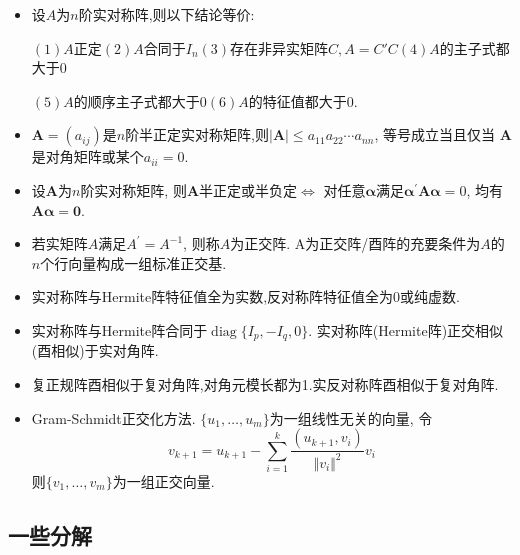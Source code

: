 \documentclass[UTF8]{ctexart}
\begin{document}
\begin{itemize}
	\item 设$A$为$n$阶实对称阵,则以下结论等价:\par
	      $(1)$$A$正定\quad $(2)$$A$合同于$I_n$\quad $(3)$存在非异实矩阵$C,A=C'C$\quad $(4)$$A$的主子式都大于$0$\par
		      $(5)$$A$的顺序主子式都大于$0$\quad $(6)$$A$的特征值都大于$0$.

	\item $\boldsymbol{A}=\left(a_{i j}\right)$是$n$阶半正定实对称矩阵,则$|\boldsymbol{A}| \leq a_{11} a_{22} \cdots a_{n n}$,
	      等号成立当且仅当 $\boldsymbol{A}$ 是对角矩阵或某个$a_{ii}=0$.

	\item 设$\boldsymbol{A}$为$n$阶实对称矩阵, 则$\boldsymbol{A}$半正定或半负定$\Leftrightarrow$
	      对任意$\boldsymbol{\alpha}$满足$\boldsymbol{\alpha}^{\prime} \boldsymbol{A} \boldsymbol{\alpha}=0$,
	      均有$\boldsymbol{A} \boldsymbol{\alpha}=\mathbf{0}$.

	\item 若实矩阵$A$满足$A^{\prime}=A^{-1}$, 则称$A$为正交阵.
	      A为正交阵/酉阵的充要条件为$A$的$n$个行向量构成一组标准正交基.

	\item 实对称阵与Hermite阵特征值全为实数,反对称阵特征值全为0或纯虚数.

	\item 实对称阵与Hermite阵合同于$\operatorname{diag}\{I_p,-I_q,0\}$.
	      实对称阵(Hermite阵)正交相似(酉相似)于实对角阵.

	\item 复正规阵酉相似于复对角阵,对角元模长都为1.实反对称阵酉相似于复对角阵.

	\item Gram-Schmidt正交化方法.
	      $\{u_1,\dots,u_m\}$为一组线性无关的向量,
	      令$$v_{k+1}=u_{k+1}-\sum _{i=1}^k\frac{(u_{k+1},v_i)}{\Vert v_i\Vert^2}v_i$$
	      则$\{v_1,\dots,v_m\}$为一组正交向量.

\end{itemize}

\subsection{一些分解}
\end{document}
